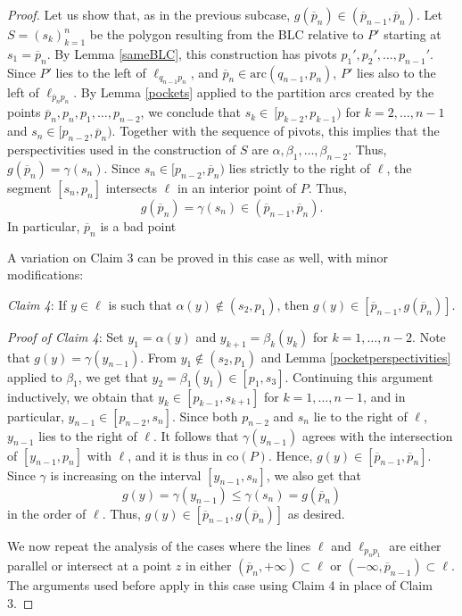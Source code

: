\documentclass[11pt]{amsart}
\theoremstyle{remark}
\numberwithin{equation}{section}
\newcommand{\co}{\mathrm{co}}
\newcommand{\arc}{\mathrm{arc}}
\renewcommand{\leq}{\leqslant}
\begin{document}
\begin{proof}
Let us show that, as in the previous subcase,  $g(\overline p_n)\in (\overline p_{n-1},\overline p_n)$. Let $S=(s_k)_{k=1}^n$ be the polygon resulting from the BLC relative to $P'$ starting at $s_1=\overline p_n$. By Lemma \ref{sameBLC}, this construction has pivots $p_1',p_2',\ldots,p_{n-1}'$. 
Since $P'$ lies to the left of $\ell_{q_{n-1}p_n}$,  and $\overline p_n\in \arc(q_{n-1},p_n)$, $P'$ lies also to the left of $\ell_{\overline p_np_n}$.
By Lemma \ref{pockets} applied to the partition arcs created by the points $\overline p_n,p_n,p_1,\ldots,p_{n-2}$, we conclude that  $s_{k}\in\ [p_{k-2},p_{k-1})$ for $k=2,\ldots,n-1$ and $s_n\in [p_{n-2},\overline p_n)$.  Together with the sequence of pivots, this implies that the perspectivities used  in the construction of $S$ are  $\alpha,\beta_1,\ldots,\beta_{n-2}$. Thus, $g(\overline p_n)=\gamma(s_n)$. Since $s_n\in [p_{n-2},\overline p_n)$ lies strictly to the right of $\ell$, the segment $[s_n,p_n]$ intersects $\ell$ in an interior point of $P$.
Thus,  
\[
g(\overline p_n)=\gamma(s_n)\in (\overline p_{n-1},\overline p_n).
\]
In particular, $\overline p_n$ is  a bad point


A variation on Claim 3 can be proved in this case as well, with minor modifications:

\emph{Claim 4}: If $y\in \ell$ is such that $\alpha(y)\notin (s_2, p_1)$, then $g(y)\in [\overline p_{n-1},g(\overline p_n)]$.

{\it Proof of Claim 4}: Set $y_1=\alpha(y)$ and $y_{k+1}=\beta_{k}(y_{k})$ for $k=1,\ldots,n-2$. Note that $g(y)=\gamma(y_{n-1})$.
From $y_1\notin (s_2, p_1)$ and Lemma \ref{pocketperspectivities} applied to $\beta_1$, we get that $y_2=\beta_1(y_1)\in [p_1,s_3]$. 
 Continuing this argument inductively, we obtain that $y_k\in [p_{k-1},s_{k+1}]$ for  $k=1,\ldots,n-1$, and in particular, $y_{n-1}\in [p_{n-2},s_n]$. Since both $p_{n-2}$ and $s_n$ lie to the right of $\ell$,  $y_{n-1}$ lies to the right of $\ell$.  
It follows that $\gamma(y_{n-1})$ agrees with the intersection of  $[y_{n-1},p_n]$ with $\ell$, and it is thus  in  $\co(P)$.
Hence, $g(y)\in [\overline p_{n-1},\overline p_n]$. Since   $\gamma$ is increasing on the interval $[y_{n-1},s_n]$, we also get that  
\[
g(y)=\gamma(y_{n-1})\leq \gamma(s_n)=g(\overline p_n)
\] 
in the order of $\ell$. Thus,  $g(y)\in [\overline p_{n-1},g(\overline p_n)]$ as desired.


We now repeat the analysis of the cases where the lines $\ell$ and $\ell_{p_np_1}$ are either parallel or intersect at a point $z$ in either
$(\overline p_n,+\infty)\subset \ell$ or $(-\infty,\overline p_{n-1})\subset \ell$. The arguments used before apply in this case   using Claim 4 in place of Claim 3. 
\end{proof}
\end{document}
